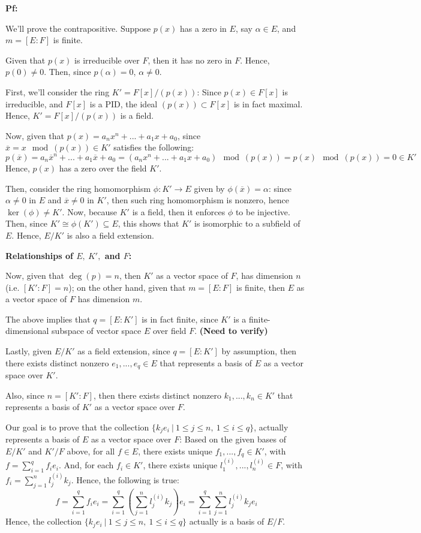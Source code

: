 \documentclass{article}
\begin{document}
\textbf{Pf:}

We'll prove the contrapositive. 
Suppose $p(x)$ has a zero in $E$, say $\alpha\in E$, and $m=[E:F]$ is finite. 

Given that $p(x)$ is irreducible over $F$, then it has no zero in $F$. Hence, $p(0)\neq 0$. Then, since $p(\alpha)=0$, $\alpha\neq 0$.

\hfil

First, we'll consider the ring $K'=F[x]/(p(x))$: Since $p(x)\in F[x]$ is irreducible, and $F[x]$ is a PID,
the ideal $(p(x))\subset F[x]$ is in fact maximal. Hence, $K'=F[x]/(p(x))$ is a field.

Now, given that $p(x)=a_nx^n+...+a_1x+a_0$, since $\overline{x} = x\mod (p(x))\in K'$ satisfies the following:
$$p(\overline{x})=a_n\overline{x}^n+...+a_1\overline{x}+a_0 = (a_nx^n+...+a_1x+a_0)\mod (p(x))=p(x)\mod (p(x))=0\in K'$$
Hence, $p(x)$ has a zero over the field $K'$.

\hfil

Then, consider the ring homomorphism $\phi:K'\rightarrow E$ given by $\phi(\overline{x})=\alpha$: since $\alpha\neq 0$ in $E$ and $\overline{x}\neq 0$ in $K'$,
then such ring homomorphism is nonzero, hence $\ker(\phi)\neq K'$. Now, because $K'$ is a field, then it enforces $\phi$ to be injective.
Then, since $K'\cong \phi(K')\subseteq E$, this shows that $K'$ is isomorphic to a subfield of $E$. Hence, $E/K'$ is also a field extension.

\hfil

\textbf{Relationships of $E,\ K',$ and $F$:}

Now, given that $\deg(p)=n$, then $K'$ as a vector space of $F$, has dimension $n$ (i.e. $[K':F]=n$); on the other hand, given that $m=[E:F]$ is finite, then $E$ as a vector space of $F$ has dimension $m$.

The above implies that $q=[E:K']$ is in fact finite, since $K'$ is a finite-dimensional subspace of vector space $E$ over field $F$. \textbf{(Need to verify)}

Lastly, given $E/K'$ as a field extension, since $q=[E:K']$ by assumption, then there exists distinct nonzero $e_1,...,e_q\in E$ that represents a basis of $E$ as a vector space over $K'$. 

Also, since $n=[K':F]$, then there exists distinct nonzero $k_1,...,k_n\in K'$ that represents a basis of $K'$ as a vector space over $F$. 

Our goal is to prove that the collection $\{k_je_i\ |\ 1\leq j\leq n,\ 1\leq i\leq q\}$, actually represents a basis of $E$ as a vector space over $F$: Based on the given bases of $E/K'$ and $K'/F$ above, for all $f\in E$,
there exists unique $f_1,...,f_q\in K'$, with $f=\sum_{i=1}^{q}f_ie_i$. And, for each $f_i\in K'$, there exists unique $l_1^{(i)},...,l_n^{(i)}\in F$, with $f_i=\sum_{j=1}^{n}l_j^{(i)}k_j$. Hence, the following is true:
$$f=\sum_{i=1}^{q}f_ie_i = \sum_{i=1}^{q}\left(\sum_{j=1}^{n}l_j^{(i)}k_j\right)e_i = \sum_{i=1}^{q}\sum_{j=1}^{n}l_j^{(i)}k_je_i$$
Hence, the collection $\{k_je_i\ |\ 1\leq j\leq n,\ 1\leq i\leq q\}$ actually is a basis of $E/F$.
\end{document}
